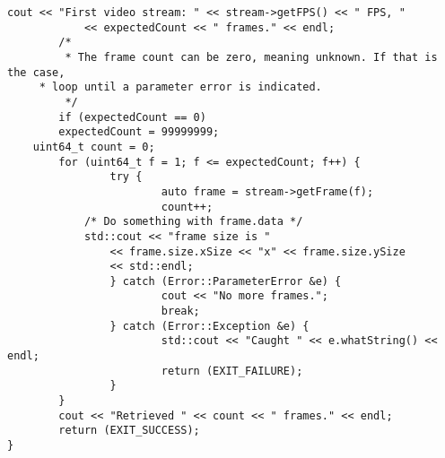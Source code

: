 \begin{lstlisting}[caption={Using the Video Framework}, label=lst:videouse]
        cout << "First video stream: " << stream->getFPS() << " FPS, "
            << expectedCount << " frames." << endl;
        /*
         * The frame count can be zero, meaning unknown. If that is the case,
	 * loop until a parameter error is indicated.
         */
        if (expectedCount == 0)
		expectedCount = 99999999;
	uint64_t count = 0;
        for (uint64_t f = 1; f <= expectedCount; f++) {
                try {
                        auto frame = stream->getFrame(f);
                        count++;
			/* Do something with frame.data */
			std::cout << "frame size is "
			    << frame.size.xSize << "x" << frame.size.ySize
			    << std::endl;
                } catch (Error::ParameterError &e) {
                        cout << "No more frames.";
                        break;
                } catch (Error::Exception &e) {
                        std::cout << "Caught " << e.whatString() << endl;
                        return (EXIT_FAILURE);
                }
        }
        cout << "Retrieved " << count << " frames." << endl;
        return (EXIT_SUCCESS);
}
\end{lstlisting}

